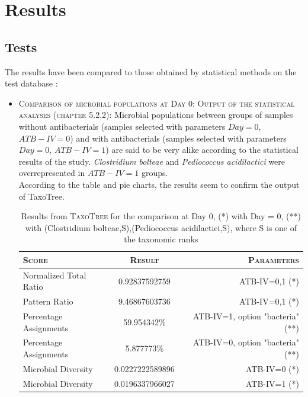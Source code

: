 \documentclass{report}
\begin{document}
\section{Results}

\subsection{Tests}

The results have been compared to those obtained by statistical methods on the test database \cite{Enaud}:

\begin{itemize}
\item \textsc{Comparison of microbial populations at Day 0:} 
       \textsc{Output of the statistical analyses (chapter 5.2.2):} Microbial populations between groups of samples without antibacterials (samples selected with parameters $Day = 0$, $ATB-IV = 0$) and with antibacterials (samples selected with parameters $Day = 0$, $ATB-IV = 1$) are said to be very alike according to the statistical results of the study. \emph{Clostridium bolteae} and \emph{Pediococcus acidilactici} were overrepresented in $ATB-IV = 1$ groups.\\

According to the table and pie charts, the results seem to confirm the output of TaxoTree.

     \begin{table}
       \caption{Results from \textsc{TaxoTree} for the comparison at Day 0, (*) with Day = 0, (**) with (Clostridium bolteae,S),(Pediococcus acidilactici,S), where S is one of the taxonomic ranks}
       \begin{tabular}{|l|c|r|}
         \hline
         \textsc{Score} & \textsc{Result} & \textsc{Parameters}\\
         \hline
         Normalized Total Ratio & 0.92837592759 & ATB-IV=0,1 (*)\\
         \hline
         Pattern Ratio & 9.46867603736 & ATB-IV=0,1 (*)\\
         \hline
         Percentage Assignments & 59.954342\% & ATB-IV=1, option "bacteria" (**)\\
         \hline
         Percentage Assignments & 5.877773\% & ATB-IV=0, option "bacteria" (**)\\
         \hline
         Microbial Diversity & 0.0227222589896 & ATB-IV=0 (*) \\
         \hline
         Microbial Diversity & 0.0196337966027 & ATB-IV=1 (*) \\
         \hline
       \end{tabular}
     \end{table}
       

\end{itemize}
\end{document}
